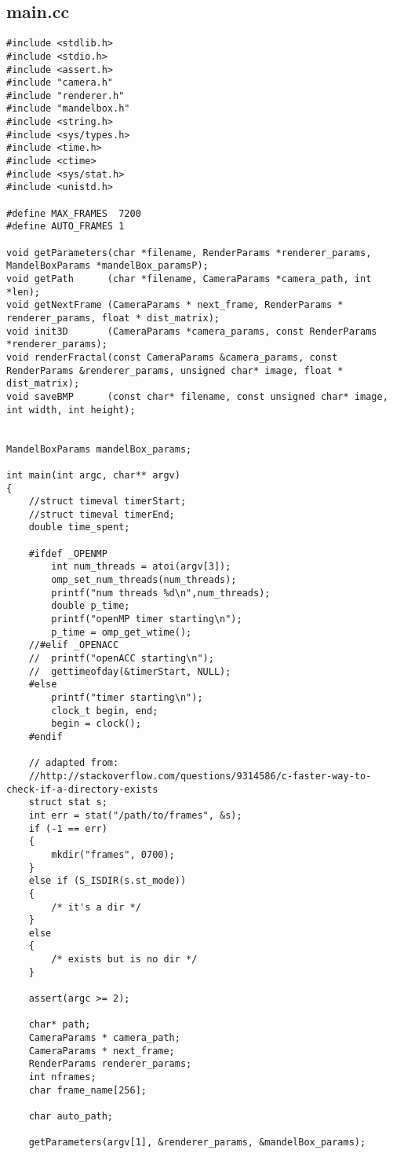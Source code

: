 \documentclass[]{article}
\begin{document}
\subsection{main.cc}
\begin{Verbatim}[fontsize= \footnotesize, tabsize=4]
#include <stdlib.h>
#include <stdio.h>
#include <assert.h>
#include "camera.h"
#include "renderer.h"
#include "mandelbox.h"
#include <string.h>
#include <sys/types.h>
#include <time.h>
#include <ctime>
#include <sys/stat.h>
#include <unistd.h>

#define MAX_FRAMES  7200
#define AUTO_FRAMES 1

void getParameters(char *filename, RenderParams *renderer_params, MandelBoxParams *mandelBox_paramsP);
void getPath      (char *filename, CameraParams *camera_path, int *len);
void getNextFrame (CameraParams * next_frame, RenderParams * renderer_params, float * dist_matrix);
void init3D       (CameraParams *camera_params, const RenderParams *renderer_params);
void renderFractal(const CameraParams &camera_params, const RenderParams &renderer_params, unsigned char* image, float * dist_matrix);
void saveBMP      (const char* filename, const unsigned char* image, int width, int height);


MandelBoxParams mandelBox_params;

int main(int argc, char** argv)
{
	//struct timeval timerStart;
	//struct timeval timerEnd;
	double time_spent;

	#ifdef _OPENMP
		int num_threads = atoi(argv[3]);
		omp_set_num_threads(num_threads);
		printf("num threads %d\n",num_threads);
		double p_time;
		printf("openMP timer starting\n");
		p_time = omp_get_wtime();
	//#elif _OPENACC
	//	printf("openACC starting\n");
	//	gettimeofday(&timerStart, NULL);
	#else
		printf("timer starting\n");
		clock_t begin, end;
		begin = clock();
	#endif

	// adapted from:
	//http://stackoverflow.com/questions/9314586/c-faster-way-to-check-if-a-directory-exists
	struct stat s;
	int err = stat("/path/to/frames", &s);
	if (-1 == err)
	{
		mkdir("frames", 0700);
	}
	else if (S_ISDIR(s.st_mode))
	{
		/* it's a dir */
	}
	else
	{
		/* exists but is no dir */
	}

	assert(argc >= 2);

	char* path;
	CameraParams * camera_path;
	CameraParams * next_frame;
	RenderParams renderer_params;
	int nframes;
	char frame_name[256];

	char auto_path;

	getParameters(argv[1], &renderer_params, &mandelBox_params);


\end{Verbatim}
\end{document}
